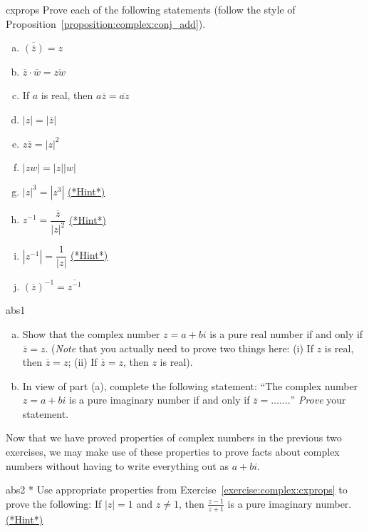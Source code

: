 \begin{exercise}{cxprops}
Prove each of the following statements (follow the style of Proposition~\ref{proposition:complex:conj_add}).
\begin{multicols}{2}
\begin{enumerate}[(a)]
\item
$\overline{(\bar{z})} = z$
\item 
$\overline{z} \cdot \overline{w} = \overline{zw}$
\item
If $a$ is real, then $a \overline{z} = \overline{az}$
\item
$|z| = | \overline{z}|$
\item
$z \overline{z} = |z|^2$
 \item
$|z w| = |z|  |w|$
\item
$|z|^3 = |z^3|$ 
\hyperref[sec:complex:hints]{(*Hint*)}
\item
$z^{-1} = \dfrac{\overline{z}}{|z|^2}$ 
\hyperref[sec:complex:hints]{(*Hint*)}

\item
$|z^{-1}| = \dfrac{1}{|z|}$
\hyperref[sec:complex:hints]{(*Hint*)}

\item
$(\overline{z})^{-1} = \overline { z^{-1} }$
\end{enumerate}
\end{multicols}
\end{exercise}

\begin{exercise}{abs1}
\begin{enumerate}[(a)]
\item
Show that the complex number $z=a+bi$ is a pure real number if and only if $\overline{z} = z$.  (\emph{Note} that you actually need to prove two things here: (i) If $z$ is real, then $\overline{z} = z$; (ii) If $\overline{z} = z$, then $z$ is real).
\item
In view of part (a), complete the following statement:  ``The complex number $z=a+bi$ is a pure imaginary number if and only if $\overline{z} = \ldots \ldots.$'' \emph{Prove} your statement.
\end{enumerate}
\end{exercise}

Now that we have proved properties of complex numbers in the previous two exercises, we may make use of these properties to prove facts about complex numbers  without having to write everything out as $a + bi$.  

\begin{exercise}{abs2}
* Use appropriate properties from Exercise~\ref{exercise:complex:cxprops} to prove the following:  If $|z| = 1$ and $z \neq 1$, then $\frac{z - 1}{z+1}$ is a pure imaginary number. 
\hyperref[sec:complex:hints]{(*Hint*)}
\end{exercise}

